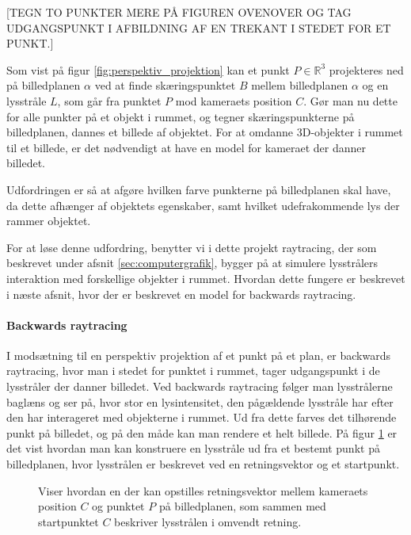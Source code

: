 [TEGN TO PUNKTER MERE PÅ FIGUREN OVENOVER OG TAG UDGANGSPUNKT I AFBILDNING AF EN TREKANT I STEDET FOR ET PUNKT.]

Som vist på figur \ref{fig:perspektiv_projektion} kan et punkt $P\in \mathbb{R}^3$ projekteres ned på billedplanen $\alpha$ ved at finde skæringspunktet $B$ mellem billedplanen $\alpha$ og en lysstråle $L$, som går fra punktet $P$ mod kameraets position $C$. Gør man nu dette for alle punkter på et objekt i rummet, og tegner skæringspunkterne på billedplanen, dannes et billede af objektet. For at omdanne 3D-objekter i rummet til et billede, er det nødvendigt at have en model for kameraet der danner billedet. 

Udfordringen er så at afgøre hvilken farve punkterne på billedplanen skal have, da dette afhænger af objektets egenskaber, samt hvilket udefrakommende lys der rammer objektet. 

For at løse denne udfordring, benytter vi i dette projekt raytracing, der som beskrevet under afsnit \ref{sec:computergrafik}, bygger på at simulere lysstrålers interaktion med forskellige objekter i rummet. Hvordan dette fungere er beskrevet i næste afsnit, hvor der er beskrevet en model for backwards raytracing.

\paragraph{Backwards raytracing}
I modsætning til en perspektiv projektion af et punkt på et plan, er backwards raytracing, hvor man i stedet for punktet i rummet, tager udgangspunkt i de lysstråler der danner billedet. Ved backwards raytracing følger man lysstrålerne baglæns og ser på, hvor stor en lysintensitet, den pågældende lysstråle har efter den har interageret med objekterne i rummet. Ud fra dette farves det tilhørende punkt på billedet, og på den måde kan man rendere et helt billede. På figur \ref{fig:raytracing_skitse} er det vist hvordan man kan konstruere en lysstråle ud fra et bestemt punkt på billedplanen, hvor lysstrålen er beskrevet ved en retningsvektor og et startpunkt.

\begin{figure}[H]
  \label{fig:raytracing_skitse}
  \centering
  \caption{Viser hvordan en der kan opstilles retningsvektor mellem kameraets position $C$ og punktet $P$ på billedplanen, som sammen med startpunktet $C$ beskriver lysstrålen i omvendt retning.}
\end{figure}

